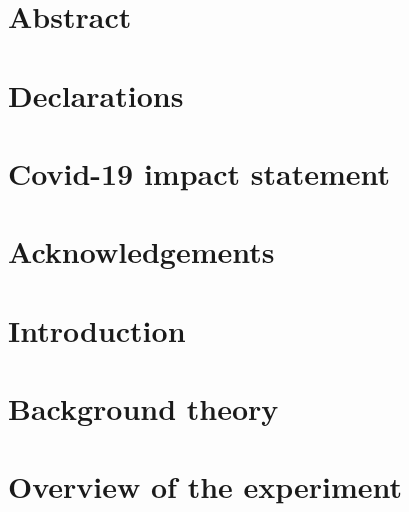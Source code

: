 \documentclass[a4paper, 12pt, twoside]{report}
\begin{document}


\chapter*{Abstract}

\clearpage

\chapter*{Declarations}

\clearpage

\chapter*{Covid-19 impact statement}

\clearpage

\chapter*{Acknowledgements}


{
\hypersetup{linkcolor=black}
\tableofcontents
}
\clearpage

{
\hypersetup{linkcolor=black}
\listoffigures
}
\clearpage
{
\hypersetup{linkcolor=black}
\listoftables
}
\clearpage

\setcounter{page}{12}


\chapter{Introduction}
\label{intro}


\chapter{Background theory}
\label{theory}


\chapter{Overview of the experiment}
\label{overview}

\end{document}
